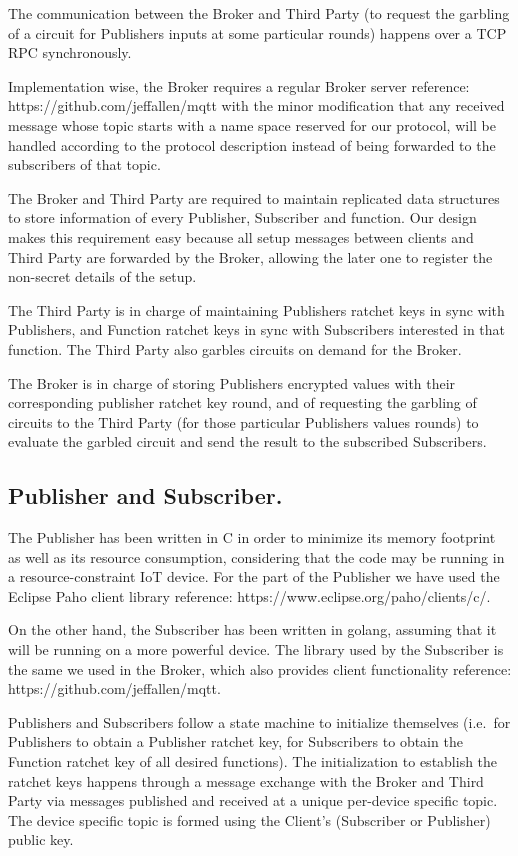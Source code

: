 The communication between the Broker and Third Party (to request the garbling
of a circuit for Publishers inputs at some particular rounds) happens over a
TCP RPC synchronously.

Implementation wise, the Broker requires a regular \MQTT{} Broker server
{reference: https://github.com/jeffallen/mqtt} with the minor modification that
any received message whose topic starts with a name space reserved for our
protocol, will be handled according to the protocol description instead of
being forwarded to the subscribers of that topic.

The Broker and Third Party are required to maintain replicated data structures
to store information of every Publisher, Subscriber and function.  Our design
makes this requirement easy because all setup messages between clients and
Third Party are forwarded by the Broker, allowing the later one to register the
non-secret details of the setup.

The Third Party is in charge of maintaining Publishers ratchet keys in sync
with Publishers, and Function ratchet keys in sync with Subscribers interested
in that function.  The Third Party also garbles circuits on demand for the
Broker.

The Broker is in charge of storing Publishers encrypted values with their
corresponding publisher ratchet key round, and of requesting the garbling of
circuits to the Third Party (for those particular Publishers values rounds) to
evaluate the garbled circuit and send the result to the subscribed Subscribers.

\subsection{Publisher and Subscriber.}

The Publisher has been written in C in order to minimize its memory footprint
as well as its resource consumption, considering that the code may be running
in a resource-constraint IoT device.  For the \MQTT{} part of the Publisher we
have used the Eclipse Paho client library {reference:
https://www.eclipse.org/paho/clients/c/}.

On the other hand, the Subscriber has been written in golang, assuming that it
will be running on a more powerful device.  The \MQTT{} library used by the
Subscriber is the same we used in the Broker, which also provides client
functionality {reference: https://github.com/jeffallen/mqtt}.

Publishers and Subscribers follow a state machine to initialize themselves
(i.e.\ for Publishers to obtain a Publisher ratchet key, for Subscribers to
obtain the Function ratchet key of all desired functions).  The initialization
to establish the ratchet keys happens through a message exchange with the
Broker and Third Party via \MQTT{} messages published and received at a unique
per-device specific topic.  The device specific topic is formed using the
Client's (Subscriber or Publisher) public key.

